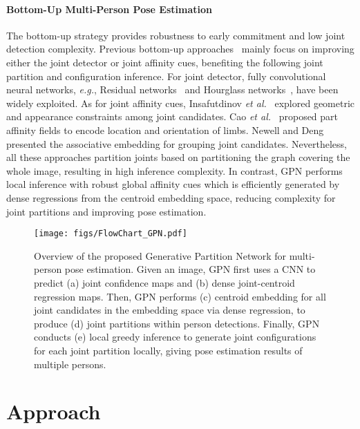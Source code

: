 \documentclass[10pt,twocolumn,letterpaper]{article}
\begin{document}
\vspace{-4mm}
\paragraph{Bottom-Up Multi-Person Pose Estimation} The bottom-up strategy provides robustness to early commitment and low joint detection complexity. Previous
bottom-up approaches~\cite{cao2017realtime,hpe:deepercut_eccv16,newell2016associative,hpe:deepcut_cvpr16} mainly focus on improving either the joint detector or  joint affinity cues, benefiting the following
joint partition and configuration inference. For joint detector, fully convolutional neural networks, \emph{e.g.},
Residual networks~\cite{he2016deep} and Hourglass networks~\cite{hpe:hourglass_arxiv15}, have been widely exploited. As for joint affinity cues, Insafutdinov \emph{et al.}~\cite{hpe:deepercut_eccv16}
explored geometric and appearance constraints among joint candidates. Cao \emph{et al.}~\cite{cao2017realtime} proposed part affinity fields to encode location and orientation of limbs.
Newell and Deng~\cite{newell2016associative} presented the associative embedding for grouping joint candidates. Nevertheless, all these approaches partition joints  based on partitioning the
graph covering the whole image, resulting in high inference complexity. In contrast, GPN performs local inference with
robust global affinity cues which is efficiently  generated by dense regressions from the centroid embedding space, reducing complexity  for joint partitions and improving pose estimation.

\begin{figure*}[t!]
\begin{center}
\texttt{[image: figs/FlowChart\_GPN.pdf]}
\caption{Overview of the proposed Generative Partition Network for multi-person pose estimation. Given an image, GPN first uses a CNN to predict (a) joint confidence maps and (b) dense joint-centroid regression maps.
         Then, GPN performs (c) centroid embedding for all joint candidates in the embedding space via dense regression, to produce (d) joint partitions within person detections.
         Finally, GPN conducts (e) local greedy inference to generate joint configurations for each joint partition locally, giving pose estimation results of multiple persons.}
\label{fig:flowchart}
\end{center}
\vspace{-20pt}
\end{figure*}

\section{Approach}
\end{document}
